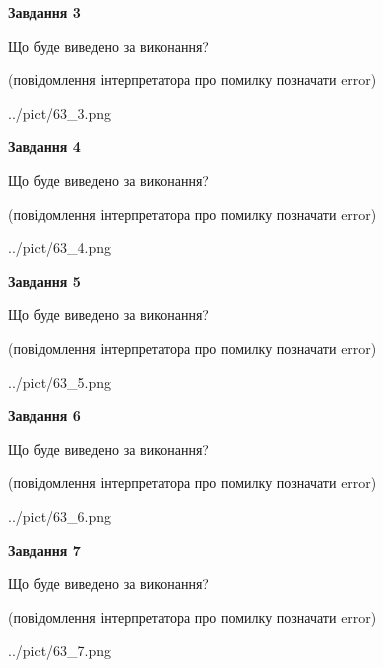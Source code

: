 \documentclass[12pt, ukrainian]{article}
\begin{document}
{\begin {large}
{\begin {center}\textbf{Завдання 3}\end {center}}\par
Що буде виведено за виконання?\par
 (повідомлення інтерпретатора про помилку позначати error)\par
\begin{center}
	{../pict/63_3.png}
\end{center}
\newpage

{\begin {center}\textbf{Завдання 4}\end {center}}\par
Що буде виведено за виконання?\par
 (повідомлення інтерпретатора про помилку позначати error)\par
\begin{center}
	{../pict/63_4.png}
\end{center}
\newpage

{\begin {center}\textbf{Завдання 5}\end {center}}\par
Що буде виведено за виконання?\par
 (повідомлення інтерпретатора про помилку позначати error)\par
\begin{center}
	{../pict/63_5.png}
\end{center}
\newpage

{\begin {center}\textbf{Завдання 6}\end {center}}\par
Що буде виведено за виконання?\par
 (повідомлення інтерпретатора про помилку позначати error)\par
\begin{center}
	{../pict/63_6.png}
\end{center}
\newpage

{\begin {center}\textbf{Завдання 7}\end {center}}\par
Що буде виведено за виконання?\par
 (повідомлення інтерпретатора про помилку позначати error)\par
\begin{center}
	{../pict/63_7.png}
\end{center}
\newpage


\end{large}}
\end{document}
